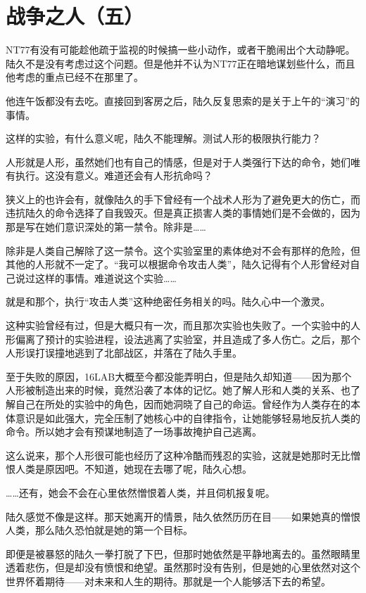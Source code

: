 \chapter{战争之人（五）}


NT77有没有可能趁他疏于监视的时候搞一些小动作，或者干脆闹出个大动静呢。陆久不是没有考虑过这个问题。但是他并不认为NT77正在暗地谋划些什么，而且他考虑的重点已经不在那里了。

他连午饭都没有去吃。直接回到客房之后，陆久反复思索的是关于上午的“演习”的事情。

这样的实验，有什么意义呢，陆久不能理解。测试人形的极限执行能力？

人形就是人形，虽然她们也有自己的情感，但是对于人类强行下达的命令，她们唯有执行。这没有意义。难道还会有人形抗命吗？

狭义上的也许会有，就像陆久的手下曾经有一个战术人形为了避免更大的伤亡，而违抗陆久的命令选择了自我毁灭。但是真正损害人类的事情她们是不会做的，因为那是写在她们意识深处的第一禁令。除非是……

除非是人类自己解除了这一禁令。这个实验室里的素体绝对不会有那样的危险，但其他的人形就不一定了。“我可以根据命令攻击人类”，陆久记得有个人形曾经对自己说过这样的事情。难道说这个实验……

就是和那个，执行“攻击人类”这种绝密任务相关的吗。陆久心中一个激灵。

这种实验曾经有过，但是大概只有一次，而且那次实验也失败了。一个实验中的人形偏离了预计的实验进程，设法逃离了实验室，并且造成了多人伤亡。之后，那个人形误打误撞地逃到了北部战区，并落在了陆久手里。

至于失败的原因，16LAB大概至今都没能弄明白，但是陆久却知道——因为那个人形被制造出来的时候，竟然沿袭了本体的记忆。她了解人形和人类的关系、也了解自己在所处的实验中的角色，因而她洞晓了自己的命运。曾经作为人类存在的本体意识是如此强大，完全压制了她核心中的自律指令，让她能够轻易地反抗人类的命令。所以她才会有预谋地制造了一场事故掩护自己逃离。

这么说来，那个人形很可能也经历了这种冷酷而残忍的实验，这就是她那时无比憎恨人类是原因吧。不知道，她现在去哪了呢，陆久心想。

……还有，她会不会在心里依然憎恨着人类，并且伺机报复呢。

陆久感觉不像是这样。那天她离开的情景，陆久依然历历在目——如果她真的憎恨人类，那么陆久恐怕就是她的第一个目标。

即便是被暴怒的陆久一拳打脱了下巴，但那时她依然是平静地离去的。虽然眼睛里透着悲伤，但是却没有愤恨和绝望。虽然那时没有告别，但是她的心里依然对这个世界怀着期待——对未来和人生的期待。那就是一个人能够活下去的希望。

